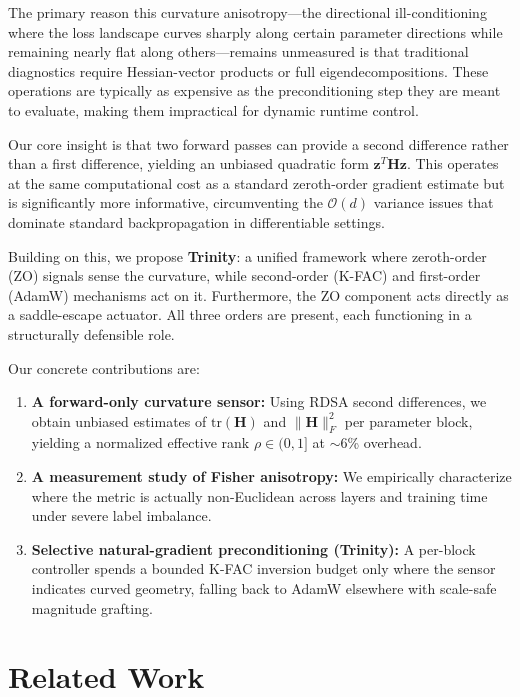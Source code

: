 \documentclass[conference]{IEEEtran}
\begin{document}
The primary reason this curvature anisotropy---the directional ill-conditioning where the loss landscape curves sharply along certain parameter directions while remaining nearly flat along others---remains unmeasured is that traditional diagnostics require Hessian-vector products or full eigendecompositions. These operations are typically as expensive as the preconditioning step they are meant to evaluate, making them impractical for dynamic runtime control.

Our core insight is that two forward passes can provide a second difference rather than a first difference, yielding an unbiased quadratic form $\mathbf{z}^T \mathbf{H} \mathbf{z}$. This operates at the same computational cost as a standard zeroth-order gradient estimate but is significantly more informative, circumventing the $\mathcal{O}(d)$ variance issues that dominate standard backpropagation in differentiable settings.

Building on this, we propose \textbf{Trinity}: a unified framework where zeroth-order (ZO) signals sense the curvature, while second-order (K-FAC) and first-order (AdamW) mechanisms act on it. Furthermore, the ZO component acts directly as a saddle-escape actuator. All three orders are present, each functioning in a structurally defensible role.

Our concrete contributions are:
\begin{enumerate}
    \item \textbf{A forward-only curvature sensor:} Using RDSA second differences, we obtain unbiased estimates of $\mathrm{tr}(\mathbf{H})$ and $\|\mathbf{H}\|_F^2$ per parameter block, yielding a normalized effective rank $\rho \in (0,1]$ at $\sim$6\% overhead.
    \item \textbf{A measurement study of Fisher anisotropy:} We empirically characterize where the metric is actually non-Euclidean across layers and training time under severe label imbalance.
    \item \textbf{Selective natural-gradient preconditioning (Trinity):} A per-block controller spends a bounded K-FAC inversion budget only where the sensor indicates curved geometry, falling back to AdamW elsewhere with scale-safe magnitude grafting.
\end{enumerate}

\section{Related Work}
\end{document}
